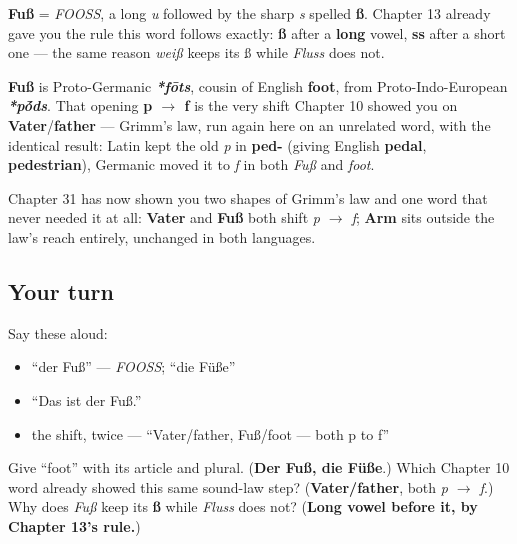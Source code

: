 \begin{sounds}
\textbf{Fuß} = \emph{FOOSS}, a long \emph{u} followed by the sharp \emph{s} spelled \textbf{ß}. Chapter 13 already gave you the rule this word follows exactly: \textbf{ß} after a \textbf{long} vowel, \textbf{ss} after a short one — the same reason \emph{weiß} keeps its ß while \emph{Fluss} does not.
\end{sounds}

\begin{cousinweb}
\textbf{Fuß} is Proto-Germanic \emph{\textbf{*fōts}}, cousin of English \textbf{foot}, from Proto-Indo-European \emph{\textbf{*p\'{\={o}}ds}}. That opening \textbf{p $\to$ f} is the very shift Chapter 10 showed you on \textbf{Vater}/\textbf{father} — Grimm's law, run again here on an unrelated word, with the identical result: Latin kept the old \emph{p} in \textbf{ped-} (giving English \textbf{pedal}, \textbf{pedestrian}), Germanic moved it to \emph{f} in both \emph{Fuß} and \emph{foot}.

Chapter 31 has now shown you two shapes of Grimm's law and one word that never needed it at all: \textbf{Vater} and \textbf{Fuß} both shift \emph{p $\to$ f}; \textbf{Arm} sits outside the law's reach entirely, unchanged in both languages.
\end{cousinweb}

\subsection*{Your turn}
Say these aloud:

\begin{itemize}
\raggedright
  \item \textquotedblleft{}der Fuß\textquotedblright{} — \emph{FOOSS}; \textquotedblleft{}die Füße\textquotedblright{}
  \item \textquotedblleft{}Das ist der Fuß.\textquotedblright{}
  \item the shift, twice — \textquotedblleft{}Vater/father, Fuß/foot — both p to f\textquotedblright{}
\end{itemize}

\begin{tcolorbox}[breakable,colback=teal!4,colframe=teal!35!black,title={Before you move on}]
Give \textquotedblleft{}foot\textquotedblright{} with its article and plural. (\textbf{Der Fuß, die Füße}.) Which Chapter 10 word already showed this same sound-law step? (\textbf{Vater/father}, both \emph{p $\to$ f}.) Why does \emph{Fuß} keep its \textbf{ß} while \emph{Fluss} does not? (\textbf{Long vowel before it, by Chapter 13's rule.})
\end{tcolorbox}
